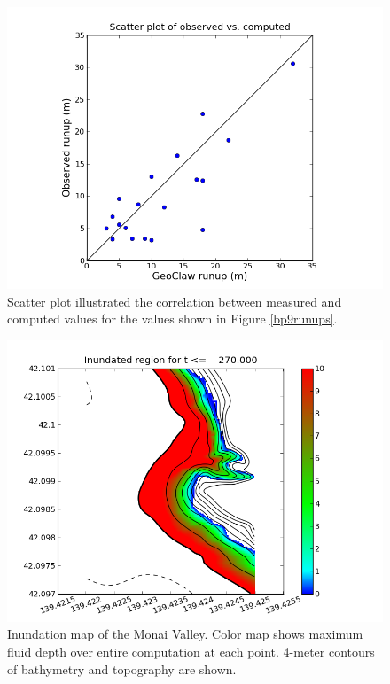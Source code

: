 
\begin{figure}[ht]
\hfil\includegraphics[width=5.0in]{bp9/scatter.png}\hfil
\caption{\label{bp9scatter}
Scatter plot illustrated the correlation between measured and computed values for the values shown in Figure \ref{bp9runups}.
  }
\end{figure}

% 

\begin{figure}[ht]
\hfil\includegraphics[width=5.0in]{bp9/in_monai.png}\hfil
\caption{\label{bp9monai}
Inundation map of the Monai Valley.  Color map shows maximum fluid depth over entire computation at each point. 4-meter contours of bathymetry and topography are shown. 
  }
\end{figure}

